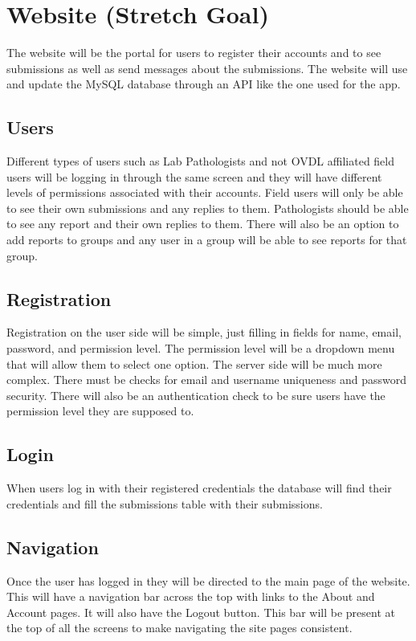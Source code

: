\documentclass[onecolumn, draftclsnofoot, article, 10pt, compsoc]{IEEEtran}
\begin{document}
\section{Website (Stretch Goal)}
The website will be the portal for users to register their accounts and to see submissions as well as send messages about the submissions. The website will use and update the MySQL database through an API like the one used for the app. 

\subsection{Users}
Different types of users such as Lab Pathologists and not OVDL affiliated field users will be logging in through the same screen and they will have different levels of permissions associated with their accounts. Field users will only be able to see their own submissions and any replies to them. Pathologists should be able to see any report and their own replies to them. There will also be an option to add reports to groups and any user in a group will be able to see reports for that group. 

\subsection{Registration}
Registration on the user side will be simple, just filling in fields for name, email, password, and permission level. The permission level will be a dropdown menu that will allow them to select one option. The server side will be much more complex. There must be checks for email and username uniqueness and password security. There will also be an authentication check to be sure users have the permission level they are supposed to. 

\subsection{Login}
When users log in with their registered credentials the database will find their credentials and fill the submissions table with their submissions. 

\subsection{Navigation}
Once the user has logged in they will be directed to the main page of the website. This will have a navigation bar across the top with links to the About and Account pages. It will also have the Logout button. This bar will be present at the top of all the screens to make navigating the site pages consistent. 
\end{document}
